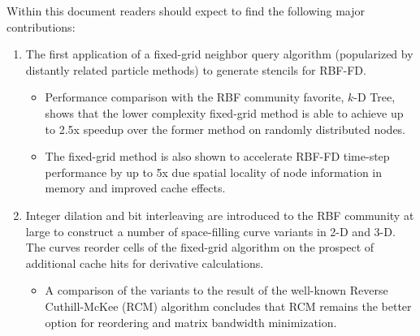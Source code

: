 \documentclass[11pt]{report}
\begin{document}
Within this document readers should expect to find the following major contributions: 
\begin{enumerate} 
\item The first application of a fixed-grid neighbor query algorithm (popularized by distantly related particle methods) to generate stencils for RBF-FD. 
\begin{itemize} 
\item Performance comparison with the RBF community favorite, $k$-D Tree, shows that the lower complexity fixed-grid method is able to achieve up to 2.5x speedup over the former method on randomly distributed nodes. 
\item The fixed-grid method is also shown to accelerate RBF-FD time-step performance by up to 5x due spatial locality of node information in memory and improved cache effects.
\end{itemize} 
\item Integer dilation and bit interleaving are introduced to the RBF community at large to construct a number of space-filling curve variants in 2-D and 3-D. The curves reorder cells of the fixed-grid algorithm on the prospect of additional cache hits for derivative calculations. 
\begin{itemize} 
\item A comparison of the variants to the result of the well-known Reverse Cuthill-McKee (RCM) algorithm concludes that RCM remains the better option for reordering and matrix bandwidth minimization.


\end{itemize}
\end{enumerate}
\end{document}
